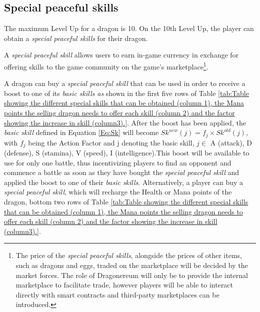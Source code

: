 \documentclass[12pt]{article}
\begin{document}
{\begin{table}[!ht]
 \end{table}




\subsection{Special peaceful skills}
\label{Special peaceful skills}  \par

The maximum Level Up for a dragon is 10. On the 10th Level Up, the player can obtain a \textit{special peaceful skills} for their dragon.\par

A \textit{special peaceful skill} allows users to earn in-game currency in exchange for offering skills to the game community on the game’s marketplace\footnote{The price of the {\it special peaceful skills}, alongside the prices of other items, such as dragons and eggs, traded on the marketplace will be decided by the market forces. The role of Dragonereum will only be to provide the internal marketplace to facilitate trade, however players will be able to interact directly with smart contracts and third-party marketplaces can be introduced.}.\par

A dragon can buy a \textit{special peaceful skill} that can be used in order to receive a boost to one of its \textit{basic skills as }shown in the first five rows of  Table \ref{tab:Table showing the different special skills that can be obtained (column 1), the Mana points the selling dragon needs to offer each skill (column 2) and the factor showing the increase in skill (column3).}. After the boost has been applied, the \textit{basic skill }defined in Equation \ref{Eq:Sk} will become $Sk^{new}(j)=f_j\times Sk^{old}(j)$, with $f_j$ being the Action Factor and j denoting the basic skill, $j \in$  {A (attack), D (defense), S (stamina), V (speed), I (intelligence)}.This boost will be available to use for only one battle, thus incentivizing players to find an opponent and commence a battle as soon as they have bought the \textit{special peaceful skill }and applied the boost to one of their \textit{basic skills}. Alternatively, a player can buy a \textit{special peaceful skill}, which will recharge the Health or Mana points of the dragon, bottom two rows of  Table \ref{tab:Table showing the different special skills that can be obtained (column 1), the Mana points the selling dragon needs to offer each skill (column 2) and the factor showing the increase in skill (column3).}.\par

}
\end{document}
